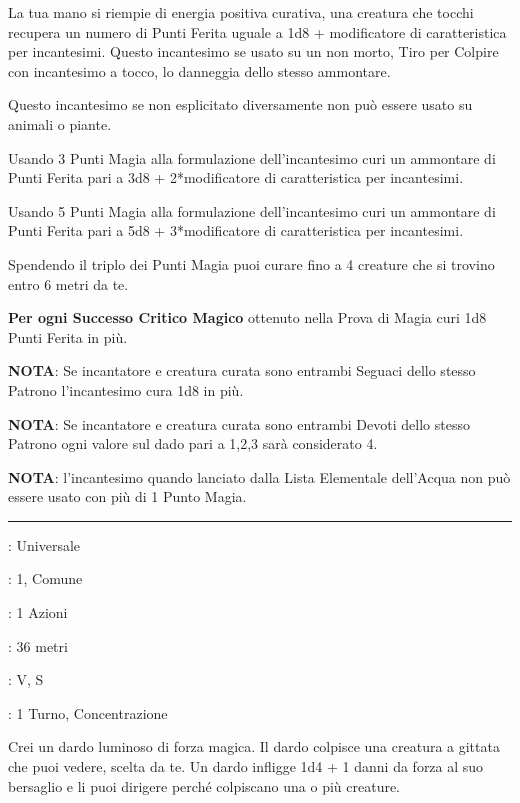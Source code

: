 \begin{multicols}{2}
La tua mano si riempie di energia positiva curativa, una creatura che tocchi recupera un numero di Punti Ferita uguale a 1d8 + modificatore di caratteristica per incantesimi. Questo incantesimo se usato su un non morto, Tiro per Colpire con incantesimo a tocco, lo danneggia dello stesso ammontare.

Questo incantesimo se non esplicitato diversamente non può essere usato su animali o piante.

Usando 3 Punti Magia alla formulazione dell'incantesimo curi un ammontare di Punti Ferita pari a 3d8 + 2*modificatore di caratteristica per incantesimi.

Usando 5 Punti Magia alla formulazione dell'incantesimo curi un ammontare di Punti Ferita pari a 5d8 + 3*modificatore di caratteristica per incantesimi.

Spendendo il triplo dei Punti Magia puoi curare fino a 4 creature che si trovino entro 6 metri da te.

\textbf{Per ogni Successo Critico Magico} ottenuto nella Prova di Magia curi 1d8 Punti Ferita in più.

\textbf{NOTA}: Se incantatore e creatura curata sono entrambi Seguaci dello stesso Patrono l'incantesimo cura 1d8 in più.

\textbf{NOTA}: Se incantatore e creatura curata sono entrambi Devoti dello stesso Patrono ogni valore sul dado pari a 1,2,3 sarà considerato 4.

\textbf{NOTA}: l'incantesimo quando lanciato dalla Lista Elementale dell'Acqua non può essere usato con più di 1 Punto Magia.

\smallskip\noindent\rule{\linewidth}{2pt} \hypertarget{Dardo arcano}{}\smallskip{}
\noindent
\begin{description}[noitemsep, topsep=0pt, parsep=0pt, partopsep=0pt, leftmargin=0cm, labelwidth=2.8cm]
	\item[\textbf{Lista di Magia}]: Universale
	\item[\textbf{Livello}]: 1, Comune
	\item[\textbf{T. di Lancio}]: 1 Azioni
	\item[\textbf{Gittata}]: 36 metri
	\item[\textbf{Componenti}]: V, S
	\item[\textbf{Durata}]: 1 Turno, Concentrazione
\end{description}

Crei un dardo luminoso di forza magica. Il dardo colpisce una creatura a gittata che puoi vedere, scelta da te. Un dardo infligge 1d4 + 1 danni da forza al suo bersaglio e li puoi dirigere perché colpiscano una o più creature.


\end{multicols}
